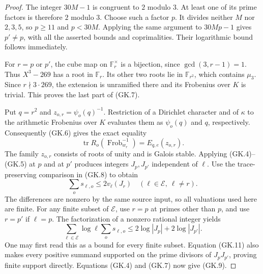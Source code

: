 \begin{proof}
The integer $30M-1$ is congruent to $2$ modulo $3$.
At least one of its prime factors is therefore $2$ modulo $3$.
Choose such a factor $p$.  It divides neither $M$ nor $2,3,5$,
so $p\ge11$ and $p<30M$.  Applying the same argument to
$30Mp-1$ gives $p'\ne p$, with all the asserted bounds and
coprimalities.  Their logarithmic bound follows immediately.

For $r=p$ or $p'$, the cube map on $\mathbb F_r^\times$ is a
bijection, since $\gcd(3,r-1)=1$.  Thus $X^3-269$ has a root
in $\mathbb F_r$.  Its other two roots lie in $\mathbb F_{r^2}$,
which contains $\mu_3$.  Since $r\nmid3\cdot269$, the extension
is unramified there and its Frobenius over $K$ is trivial.
This proves the last part of (GK.7).

Put $q=r^2$ and $z_{o,r}=\psi_o(q)^{-1}$.
Restriction of a Dirichlet character and of $\kappa$ to the
arithmetic Frobenius over $K$ evaluates them as $\psi_o(q)$ and
$q$, respectively.  Consequently (GK.6) gives the exact equality
\[
 \operatorname{tr}R_o(\operatorname{Frob}_{w_r}^{-1})
                        =E_{q,e}(z_{o,r}).                    \tag{GK.10}
\]
The family $z_{o,r}$ consists of roots of unity and is Galois
stable.  Applying (GK.4)--(GK.5) at $p$ and at $p'$ produces
integers $J_p,J_{p'}$ independent of $\ell$.  Use the
trace-preserving comparison in (GK.8) to obtain
\[
 \sum_os_{\ell,o}\le2v_\ell(J_r)
        \quad(\ell\in\mathcal E,\ \ell\ne r).                \tag{GK.11}
\]
The differences are nonzero by the same source input, so all
valuations used here are finite.
For any finite subset of $\mathcal E$, use $r=p$ at primes other
than $p$, and use $r=p'$ if $\ell=p$.  The factorization of a
nonzero rational integer yields
\[
 \sum_{\ell\in\mathcal E}\log\ell\sum_os_{\ell,o}
   \le2\log|J_p|+2\log|J_{p'}|.
\]
One may first read this as a bound for every finite subset.
Equation (GK.11) also makes every positive summand supported on
the prime divisors of $J_pJ_{p'}$, proving finite support directly.
Equations (GK.4) and (GK.7) now give (GK.9).
\end{proof}

